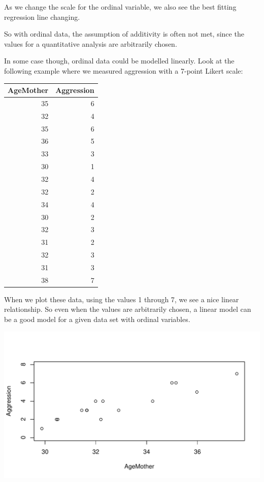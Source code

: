 \documentclass[]{report}\usepackage[]{graphicx}\usepackage[]{color}
\makeatletter
\def\maxwidth{ %
  \ifdim\Gin@nat@width>\linewidth
    \linewidth
  \else
    \Gin@nat@width
  \fi
}
\newenvironment{knitrout}{}{} %
\makeatother
\begin{document}
As we change the scale for the ordinal variable, we also see the best fitting regression line changing. 

So with ordinal data, the assumption of additivity is often not met, since the values for a quantitative analysis are arbitrarily chosen. 

In some case though, ordinal data could be modelled linearly. Look at the following example where we measured aggression with a 7-point Likert scale:


\begin{knitrout}
\color{fgcolor}
\begin{tabular}{r|r}
\hline
AgeMother & Aggression\\
\hline
35 & 6\\
\hline
32 & 4\\
\hline
35 & 6\\
\hline
36 & 5\\
\hline
33 & 3\\
\hline
30 & 1\\
\hline
32 & 4\\
\hline
32 & 2\\
\hline
34 & 4\\
\hline
30 & 2\\
\hline
32 & 3\\
\hline
31 & 2\\
\hline
32 & 3\\
\hline
31 & 3\\
\hline
38 & 7\\
\hline
\end{tabular}


\end{knitrout}

When we plot these data, using the values 1 through 7, we see a nice linear relationship. So even when the values are arbitrarily chosen, a linear model can be a good model for a given data set with ordinal variables. 

\begin{knitrout}
\color{fgcolor}

{\centering \includegraphics[width=\maxwidth]{figure/fig1121-1} 

}



\end{knitrout}
\end{document}
